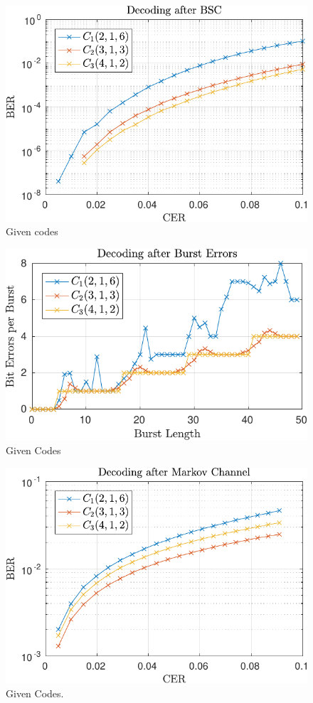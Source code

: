 
\begin{figure}
\centering
\includegraphics[scale=1]{../figures/qirandom.pdf} 
\caption{Given codes}
\end{figure}

\begin{figure}
\centering
\includegraphics[scale=1]{../figures/qiburst.pdf} 
\caption{Given Codes}
\end{figure}

\begin{figure}
\centering
\includegraphics[scale=1]{../figures/qimarkov.pdf} 
\caption{Given Codes.}
\end{figure}